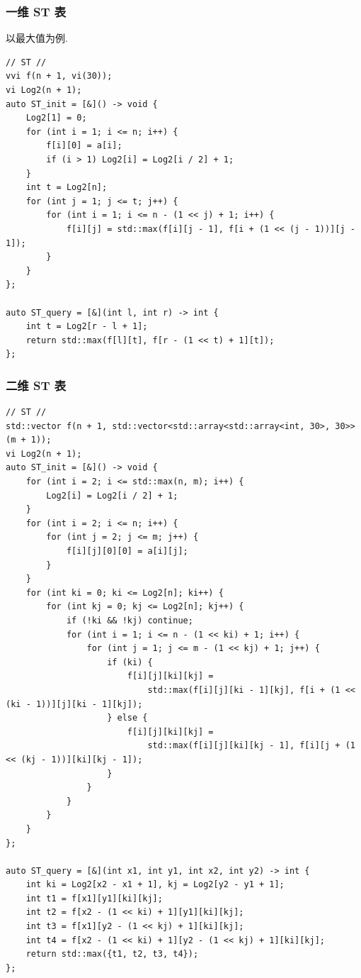 \documentclass[UTF8, a4paper, titlepage, twoside]{ctexart}
\begin{document}
\subsubsection{ 一维 ST 表 }
以最大值为例. 
\begin{lstlisting}[style = cpp]
// ST //
vvi f(n + 1, vi(30));
vi Log2(n + 1);
auto ST_init = [&]() -> void {
    Log2[1] = 0;
    for (int i = 1; i <= n; i++) {
        f[i][0] = a[i];
        if (i > 1) Log2[i] = Log2[i / 2] + 1;
    }
    int t = Log2[n];
    for (int j = 1; j <= t; j++) {
        for (int i = 1; i <= n - (1 << j) + 1; i++) {
            f[i][j] = std::max(f[i][j - 1], f[i + (1 << (j - 1))][j - 1]);
        }
    }
};

auto ST_query = [&](int l, int r) -> int {
    int t = Log2[r - l + 1];
    return std::max(f[l][t], f[r - (1 << t) + 1][t]);
};
\end{lstlisting}

\subsubsection{ 二维 ST 表 }
\begin{lstlisting}[style=cpp]
// ST //
std::vector f(n + 1, std::vector<std::array<std::array<int, 30>, 30>>(m + 1));
vi Log2(n + 1);
auto ST_init = [&]() -> void {
    for (int i = 2; i <= std::max(n, m); i++) {
        Log2[i] = Log2[i / 2] + 1;
    }
    for (int i = 2; i <= n; i++) {
        for (int j = 2; j <= m; j++) {
            f[i][j][0][0] = a[i][j];
        }
    }
    for (int ki = 0; ki <= Log2[n]; ki++) {
        for (int kj = 0; kj <= Log2[n]; kj++) {
            if (!ki && !kj) continue;
            for (int i = 1; i <= n - (1 << ki) + 1; i++) {
                for (int j = 1; j <= m - (1 << kj) + 1; j++) {
                    if (ki) {
                        f[i][j][ki][kj] =
                            std::max(f[i][j][ki - 1][kj], f[i + (1 << (ki - 1))][j][ki - 1][kj]);
                    } else {
                        f[i][j][ki][kj] =
                            std::max(f[i][j][ki][kj - 1], f[i][j + (1 << (kj - 1))][ki][kj - 1]);
                    }
                }
            }
        }
    }
};

auto ST_query = [&](int x1, int y1, int x2, int y2) -> int {
    int ki = Log2[x2 - x1 + 1], kj = Log2[y2 - y1 + 1];
    int t1 = f[x1][y1][ki][kj];
    int t2 = f[x2 - (1 << ki) + 1][y1][ki][kj];
    int t3 = f[x1][y2 - (1 << kj) + 1][ki][kj];
    int t4 = f[x2 - (1 << ki) + 1][y2 - (1 << kj) + 1][ki][kj];
    return std::max({t1, t2, t3, t4});
};
\end{lstlisting}
\end{document}
